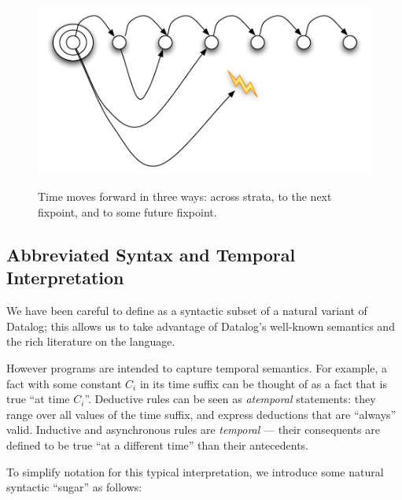 \begin{figure}[t]
  \centering
  \includegraphics[width=0.75\linewidth]{dedalus-time.pdf}
  \label{fig:dedalus-time}
  \caption{Time moves forward in three ways: across strata, to the next fixpoint, and to some future fixpoint.}
\vspace{-8pt}
\end{figure}


\subsection{Abbreviated Syntax and Temporal Interpretation}
We have been careful to define \lang as a syntactic subset of a
natural variant of Datalog; this allows us to take advantage of
Datalog's well-known semantics and the rich literature on the
language.

However \lang programs are intended to capture 
temporal semantics.  For example, a fact with some constant $C_i$ in its time
suffix can be thought of as a fact that is true ``at time $C_i$''.  Deductive
rules can be seen as {\em atemporal} statements: they range over all values of
the time suffix, and express deductions that are ``always'' valid.  Inductive
and asynchronous rules are {\em temporal} --- their consequents are defined to
be true ``at a different time'' than their antecedents. 

To simplify \lang notation for this typical interpretation,  we introduce
some natural syntactic ``sugar'' as follows:  

